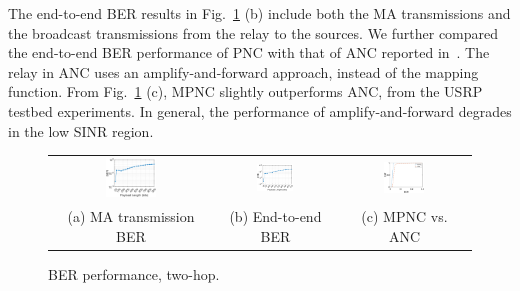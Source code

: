 %                         


The end-to-end BER results in Fig.~\ref{fig:e2e_ber} (b) include both the MA transmissions and the broadcast transmissions from the relay to the sources. We further compared the end-to-end BER performance of PNC with that of ANC reported in~\cite{katti2007embracing}. The relay in ANC uses an amplify-and-forward approach, instead of the mapping function. From Fig.~\ref{fig:e2e_ber} (c),  MPNC slightly outperforms ANC, from the USRP testbed experiments. In general, the performance of amplify-and-forward degrades in the low SINR region. 

\begin{figure} [th]
\centering
\begin{tabular}{ccc}
    \includegraphics[width=0.33\textwidth]{figures/BER_Payload_MA.eps} &
    \includegraphics[width=0.33\textwidth]{figures/BER_Payload_e2e.eps}&
     \includegraphics[width=0.33\textwidth]{figures/cdf}\\
      (a) MA  transmission BER &    (b) End-to-end BER & (c) MPNC vs. ANC
      \end{tabular}
       \caption{BER performance, two-hop.}
    \label{fig:e2e_ber}
\end{figure}

